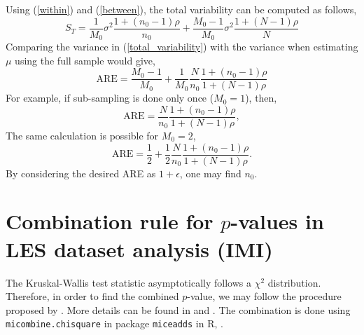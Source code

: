 \documentclass[11pt,a5paper,twoside]{book}
\begin{document}
{\begin{equation}
\end{equation}
Using (\ref{within}) and (\ref{between}), the total variability can be computed as follows,
\begin{equation}
\label{total_variability}
S_T= \frac{1}{M_0} \sigma^2 \frac{1+ (n_0-1) \rho }{n_0} + \frac{M_0-1}{M_0} \sigma^2 \frac{1+ (N-1) \rho}{N}
\end{equation}
Comparing the variance in (\ref{total_variability}) with the variance when estimating $\mu$ using the full sample would give,
\begin{equation}
\label{ARE}
\mathrm{ARE} = \frac{M_0-1}{M_0} + \frac{1}{M_0} \frac{N}{n_0} \frac{1+(n_0-1) \rho}{1+ (N-1) \rho}
\end{equation}
For example, if sub-sampling is done only once ($M_0=1$), then,
\begin{equation}
\label{ARE_M1}
\mathrm{ARE} = \frac{N}{n_0} \frac{1+(n_0-1) \rho}{1+(N-1) \rho},
\end{equation}
The same calculation is possible for $M_0=2$,
\begin{equation}
\label{are_M02}
\mathrm{ARE}= \frac{1}{2} + \frac{1}{2} \frac{N}{n_0} \frac{1+(n_0-1) \rho}{1+ (N-1) \rho}.
\end{equation}
By considering the desired ARE as $1+\epsilon$, one may find $n_0$.



\section{Combination rule for $p$-values in LES dataset analysis (IMI)}


The Kruskal-Wallis test statistic asymptotically follows a $\chi^2$ distribution. Therefore, in order to find the combined $p$-value, we may follow the procedure proposed by \cite{li1991}. More details can be found in \cite{rubin2004} and \cite{enders2010}. The combination is done using {\tt{micombine.chisquare}} in package {\tt{miceadds}} in \textsf{R}, \cite{miceadds}.

}
\end{document}
